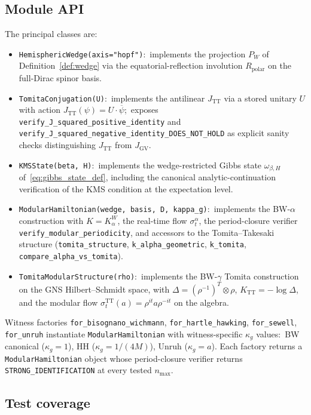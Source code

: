 \documentclass[11pt,a4paper]{article}
\theoremstyle{plain}
\theoremstyle{definition}
\newcommand{\nmax}{n_{\max}}
\newcommand{\TT}{\mathrm{TT}}
\begin{document}
\subsection{Module API}\label{sec:module_api}

The principal classes are:
\begin{itemize}\setlength{\itemsep}{2pt}
\item \texttt{HemisphericWedge(axis="hopf")}:\ implements the projection
$P_W$ of Definition~\ref{def:wedge} via the equatorial-reflection
involution $R_{\mathrm{polar}}$ on the full-Dirac spinor basis.
\item \texttt{TomitaConjugation(U)}:\ implements the antilinear
$J_{\TT}$ via a stored unitary $U$ with action
$J_{\TT}(\psi) = U \cdot \overline{\psi}$;\ exposes
\texttt{verify\_J\_squared\_positive\_identity} and
\texttt{verify\_J\_squared\_negative\_identity\_DOES\_NOT\_HOLD} as
explicit sanity checks distinguishing $J_{\TT}$ from
$J_{\mathrm{GV}}$.
\item \texttt{KMSState(beta, H)}:\ implements the wedge-restricted
Gibbs state $\omega_{\beta, H}$ of~\eqref{eq:gibbs_state_def},
including the canonical analytic-continuation verification of the
KMS condition at the expectation level.
\item \texttt{ModularHamiltonian(wedge, basis, D, kappa\_g)}:\
implements the BW-$\alpha$ construction with $K = K_\alpha^W$, the
real-time flow $\sigma_t^{\alpha}$, the period-closure verifier
\texttt{verify\_modular\_periodicity}, and accessors to the
Tomita--Takesaki structure (\texttt{tomita\_structure},
\texttt{k\_alpha\_geometric}, \texttt{k\_tomita},
\texttt{compare\_alpha\_vs\_tomita}).
\item \texttt{TomitaModularStructure(rho)}:\ implements the
BW-$\gamma$ Tomita construction on the GNS Hilbert--Schmidt space,
with $\Delta = (\rho^{-1})^T \otimes \rho$, $K_{\TT} = -\log \Delta$,
and the modular flow $\sigma_t^{\TT}(a) = \rho^{it} a \rho^{-it}$ on
the algebra.
\end{itemize}
Witness factories \texttt{for\_bisognano\_wichmann},
\texttt{for\_hartle\_hawking}, \texttt{for\_sewell},
\texttt{for\_unruh} instantiate
\texttt{ModularHamiltonian} with witness-specific $\kappa_g$ values:\
BW canonical ($\kappa_g = 1$), HH ($\kappa_g = 1/(4M)$),
Unruh ($\kappa_g = a$). Each factory returns a
\texttt{ModularHamiltonian} object whose period-closure verifier
returns \texttt{STRONG\_IDENTIFICATION} at every tested $\nmax$.

\subsection{Test coverage}\label{sec:test_coverage}
\end{document}
